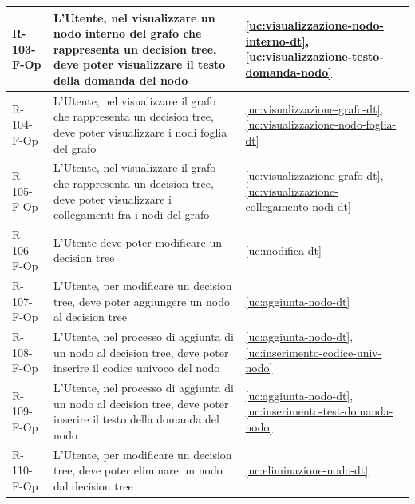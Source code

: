 ﻿\documentclass[a4paper,12pt]{article}
\begin{document}
{{\begin{longtable}{|l|p{}|p{}|}
            R-103-F-Op       & L'Utente, nel visualizzare un nodo interno del grafo che rappresenta un decision tree, deve poter visualizzare il testo della domanda del nodo                                              & \ref{uc:visualizzazione-nodo-interno-dt}, \ref{uc:visualizzazione-testo-domanda-nodo} \\ \hline
            R-104-F-Op       & L'Utente, nel visualizzare il grafo che rappresenta un decision tree, deve poter visualizzare i nodi foglia del grafo                                                                       & \ref{uc:visualizzazione-grafo-dt}, \ref{uc:visualizzazione-nodo-foglia-dt}         \\ \hline
            R-105-F-Op       & L'Utente, nel visualizzare il grafo che rappresenta un decision tree, deve poter visualizzare i collegamenti fra i nodi del grafo                                                           & \ref{uc:visualizzazione-grafo-dt}, \ref{uc:visualizzazione-collegamento-nodi-dt}         \\ \hline
            R-106-F-Op       & L'Utente deve poter modificare un decision tree                                                                                                                                             & \ref{uc:modifica-dt}                                               \\ \hline
            R-107-F-Op       & L'Utente, per modificare un decision tree, deve poter aggiungere un nodo al decision tree                                                                                                   & \ref{uc:aggiunta-nodo-dt}                                               \\ \hline
            R-108-F-Op       & L'Utente, nel processo di aggiunta di un nodo al decision tree, deve poter inserire il codice univoco del nodo                                                                              & \ref{uc:aggiunta-nodo-dt}, \ref{uc:inserimento-codice-univ-nodo}                 \\ \hline
            R-109-F-Op       & L'Utente, nel processo di aggiunta di un nodo al decision tree, deve poter inserire il testo della domanda del nodo                                                                         & \ref{uc:aggiunta-nodo-dt}, \ref{uc:inserimento-test-domanda-nodo}                 \\ \hline
            R-110-F-Op       & L'Utente, per modificare un decision tree, deve poter eliminare un nodo dal decision tree                                                                                                   & \ref{uc:eliminazione-nodo-dt}                                               \\ \hline

\end{longtable}}}
\end{document}
